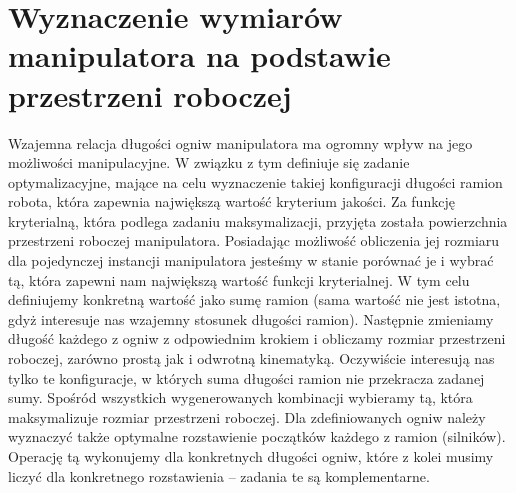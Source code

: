 \documentclass[printmode]{mgr}
\begin{document}
\section{Wyznaczenie wymiarów manipulatora na podstawie przestrzeni roboczej}
Wzajemna relacja długości ogniw manipulatora ma ogromny wpływ na jego możliwości manipulacyjne. W związku z tym definiuje się
zadanie optymalizacyjne, mające na celu wyznaczenie takiej konfiguracji długości ramion robota, która zapewnia największą
wartość kryterium jakości. Za funkcję kryterialną, która podlega zadaniu maksymalizacji, przyjęta została powierzchnia 
przestrzeni roboczej manipulatora.
Posiadając możliwość obliczenia jej rozmiaru dla pojedynczej instancji 
manipulatora jesteśmy w stanie porównać je i wybrać tą, która zapewni nam największą wartość funkcji kryterialnej.
W tym celu definiujemy konkretną wartość jako sumę ramion (sama wartość nie jest istotna, gdyż
interesuje nas wzajemny stosunek długości ramion). Następnie zmieniamy długość każdego z ogniw z odpowiednim krokiem
i obliczamy rozmiar przestrzeni roboczej, zarówno prostą jak i odwrotną kinematyką. Oczywiście interesują nas tylko te
konfiguracje, w których suma długości ramion nie przekracza zadanej sumy. Spośród wszystkich wygenerowanych kombinacji wybieramy tą,
która maksymalizuje rozmiar przestrzeni roboczej. Dla zdefiniowanych ogniw należy wyznaczyć także optymalne rozstawienie
początków każdego z ramion (silników). Operację tą wykonujemy dla konkretnych długości ogniw, które z kolei musimy liczyć dla 
konkretnego rozstawienia -- zadania te są komplementarne.
\end{document}
